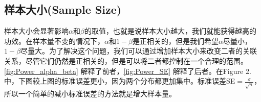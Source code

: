 \documentclass[UTF8]{ctexbook}
\begin{document}
\subsection{样本大小(Sample Size)}
样本大小会显著影响$\alpha$和$\beta$的取值，也就是说样本大小越大，我们就能获得越高的功效。在样本量不变的情况下，$\alpha$和$1-\beta$是正相关的，但是我们希望$\alpha$尽量小，$1-\beta$尽量大。为了解决这个问题，我们可以通过增加样本大小来改变二者的关联关系，尽管它们仍然是正相关的，但是可以将二者都控制在一个合理的范围。\ref{fig:Power_alpha_beta} 解释了前者，\ref{fig:Power_SE} 解释了后者。在Figure 2. 中，下图较上图的标准误差更小，因为两个分布都更加集中。标准误差SE$=\displaystyle\frac{\sigma}{\sqrt{n}}$，所以一个简单的减小标准误差的方法就是增大样本量。

\end{document}
